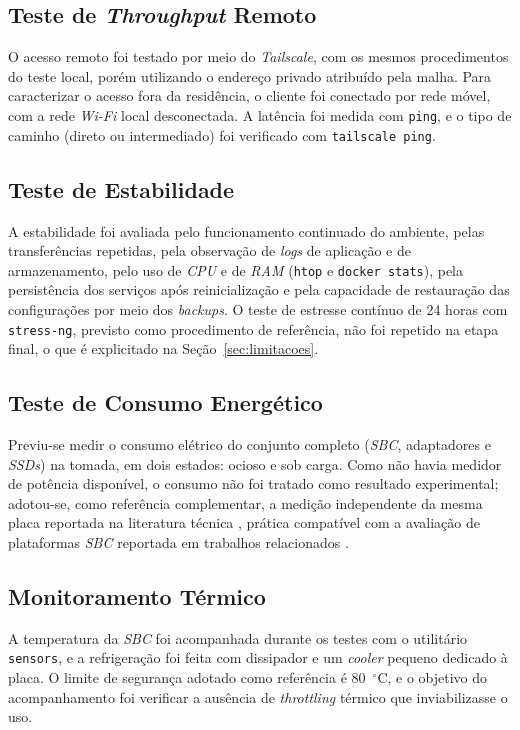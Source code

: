 \subsection{Teste de \textit{Throughput} Remoto}

O acesso remoto foi testado por meio do \textit{Tailscale}, com os mesmos procedimentos do teste local, porém utilizando o endereço privado atribuído pela malha. Para caracterizar o acesso fora da residência, o cliente foi conectado por rede móvel, com a rede \textit{Wi-Fi} local desconectada. A latência foi medida com \texttt{ping}, e o tipo de caminho (direto ou intermediado) foi verificado com \texttt{tailscale ping}.

\subsection{Teste de Estabilidade}

A estabilidade foi avaliada pelo funcionamento continuado do ambiente, pelas transferências repetidas, pela observação de \textit{logs} de aplicação e de armazenamento, pelo uso de \textit{CPU} e de \textit{RAM} (\texttt{htop} e \texttt{docker stats}), pela persistência dos serviços após reinicialização e pela capacidade de restauração das configurações por meio dos \textit{backups}. O teste de estresse contínuo de 24 horas com \texttt{stress-ng}, previsto como procedimento de referência, não foi repetido na etapa final, o que é explicitado na Seção~\ref{sec:limitacoes}.

\subsection{Teste de Consumo Energético}

Previu-se medir o consumo elétrico do conjunto completo (\textit{SBC}, adaptadores e \textit{SSDs}) na tomada, em dois estados: ocioso e sob carga. Como não havia medidor de potência disponível, o consumo não foi tratado como resultado experimental; adotou-se, como referência complementar, a medição independente da mesma placa reportada na literatura técnica \cite{sbc2026}, prática compatível com a avaliação de plataformas \textit{SBC} reportada em trabalhos relacionados \cite{johnston2018}.

\subsection{Monitoramento Térmico}

A temperatura da \textit{SBC} foi acompanhada durante os testes com o utilitário \texttt{sensors}, e a refrigeração foi feita com dissipador e um \textit{cooler} pequeno dedicado à placa. O limite de segurança adotado como referência é 80~$^\circ$C, e o objetivo do acompanhamento foi verificar a ausência de \textit{throttling} térmico que inviabilizasse o uso.


